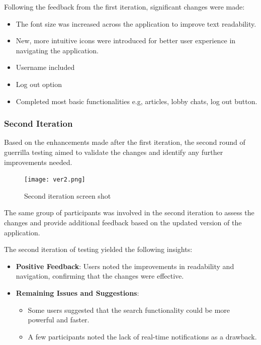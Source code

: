 \documentclass[12pt,a4paper]{article}
\newcounter{subsubsubsection}[subsubsection]
\begin{document}
Following the feedback from the first iteration, significant changes were made:
\begin{itemize}
    \item The font size was increased across the application to improve text readability.
    \item New, more intuitive icons were introduced for better user experience in navigating the application.
    \item Username included
    \item Log out option
    \item Completed most basic functionalities e.g, articles, lobby chats, log out button. 
\end{itemize}

\subsubsection*{Second Iteration}
Based on the enhancements made after the first iteration, the second round of guerrilla testing aimed to validate the changes and identify any further improvements needed.

\begin{figure}[H]
\centering
\texttt{[image: ver2.png]} 
\caption{Second iteration screen shot}
\label{fig:sitemap}
\end{figure}

The same group of participants was involved in the second iteration to assess the changes and provide additional feedback based on the updated version of the application.

The second iteration of testing yielded the following insights:
\begin{itemize}
    \item \textbf{Positive Feedback}: Users noted the improvements in readability and navigation, confirming that the changes were effective.
    \item \textbf{Remaining Issues and Suggestions}:
    \begin{itemize}
        \item Some users suggested that the search functionality could be more powerful and faster.
        \item A few participants noted the lack of real-time notifications as a drawback.
    \end{itemize}
\end{itemize}
\end{document}
